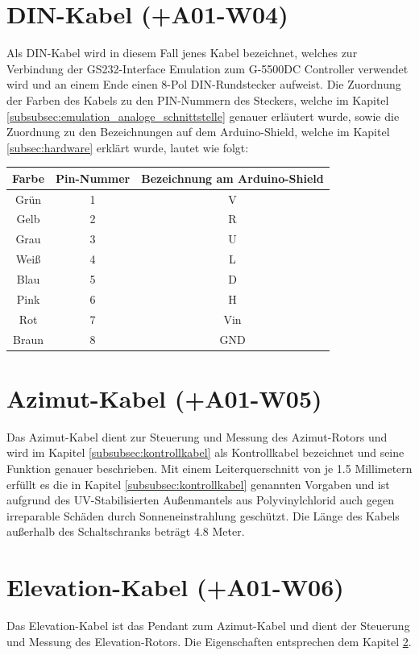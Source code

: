 \section{DIN-Kabel (+A01-W04)}
Als DIN-Kabel wird in diesem Fall jenes Kabel bezeichnet, welches zur Verbindung der GS232-Interface Emulation zum G-5500DC Controller verwendet wird und an einem Ende einen 8-Pol DIN-Rundstecker aufweist. Die Zuordnung der Farben des Kabels zu den PIN-Nummern des Steckers, welche im Kapitel \ref{subsubsec:emulation_analoge_schnittstelle} genauer erläutert wurde, sowie die Zuordnung zu den Bezeichnungen auf dem Arduino-Shield, welche im Kapitel \ref{subsec:hardware} erklärt wurde, lautet wie folgt:

\begin{tabular}{c|c|c}
	\textbf{Farbe} & \textbf{Pin-Nummer} & \textbf{Bezeichnung am Arduino-Shield} \\
	\hline
	Grün & 1 & V \\
	Gelb & 2 & R \\
	Grau & 3 & U \\
	Weiß & 4 & L \\
	Blau & 5 & D \\
	Pink & 6 & H \\
	Rot & 7 & Vin \\
	Braun & 8 & GND \\
\end{tabular}

\section{Azimut-Kabel (+A01-W05)}
\label{sec:azimutkabel}
Das Azimut-Kabel dient zur Steuerung und Messung des Azimut-Rotors und wird im Kapitel \ref{subsubsec:kontrollkabel} als Kontrollkabel bezeichnet und seine Funktion genauer beschrieben. Mit einem Leiterquerschnitt von je 1.5 Millimetern erfüllt es die in Kapitel \ref{subsubsec:kontrollkabel} genannten Vorgaben und ist aufgrund des UV-Stabilisierten Außenmantels aus Polyvinylchlorid auch gegen irreparable Schäden durch Sonneneinstrahlung geschützt. Die Länge des Kabels außerhalb des Schaltschranks beträgt 4.8 Meter. 

\section{Elevation-Kabel (+A01-W06)}
Das Elevation-Kabel ist das Pendant zum Azimut-Kabel und dient der Steuerung und Messung des Elevation-Rotors. Die Eigenschaften entsprechen dem Kapitel \ref{sec:azimutkabel}.

